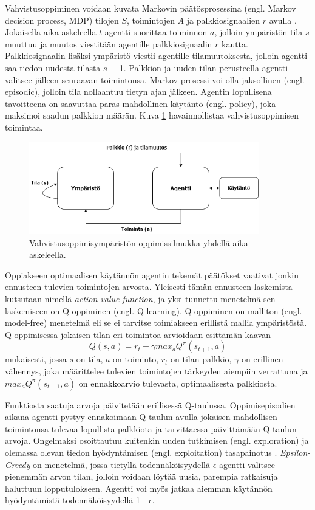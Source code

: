 \documentclass[utf8]{gradu3}
\begin{document}
Vahvistusoppiminen voidaan kuvata Markovin päätösprosessina (engl. Markov decision process, MDP) tilojen \(S\), toimintojen \(A\) ja palkkiosignaalien \(r\) avulla \parencite{arulkumaran2017brief}. Jokaisella aika-askeleella \(t\) agentti suorittaa toiminnon \(a\), jolloin ympäristön tila \(s\) muuttuu ja muutos viestitään agentille palkkiosignaalin \(r\) kautta. Palkkiosignaalin lisäksi ympäristö viestii agentille tilamuutoksesta, jolloin agentti saa tiedon uudesta tilasta \(s\) + 1. Palkkion ja uuden tilan perusteella agentti valitsee jälleen seuraavan toimintonsa. Markov-prosessi voi olla jaksollinen (engl. episodic), jolloin tila nollaantuu tietyn ajan jälkeen. Agentin lopullisena tavoitteena on saavuttaa paras mahdollinen käytäntö (engl. policy), joka maksimoi saadun palkkion määrän. Kuva \ref{reinflearning} havainnollistaa vahvistusoppimisen toimintaa.

\begin{figure}[h]
\includegraphics[width=10cm]{reinflearning.png}
\caption{Vahvistusoppimisympäristön oppimissilmukka yhdellä aika-askeleella.}
\label{reinflearning}
\end{figure}

Oppiakseen optimaalisen käytännön agentin tekemät päätökset vaativat jonkin ennusteen tulevien toimintojen arvosta. Yleisesti tämän ennusteen laskemista kutsutaan nimellä \textit{action-value function}, ja yksi tunnettu menetelmä sen laskemiseen on Q-oppiminen (engl. Q-learning). Q-oppiminen on malliton (engl. model-free) menetelmä eli se ei tarvitse toimiakseen erillistä mallia ympäristöstä. Q-oppimisessa jokaisen tilan eri toimintoa arvioidaan \textcite{arulkumaran2017brief} esittämän kaavan \[Q(s,a) = r_t + \gamma max_a Q^\pi (s_{t+1},a)\] mukaisesti, jossa \(s\) on tila, \(a\) on toiminto, \(r_t\) on tilan palkkio, $\gamma$ on erillinen vähennys, joka määrittelee tulevien toimintojen tärkeyden aiempiin verrattuna ja \(max_a Q^\pi (s_{t+1},a)\) on ennakkoarvio tulevasta, optimaalisesta palkkiosta.

Funktiosta saatuja arvoja päivitetään erillisessä Q-taulussa. Oppimisepisodien aikana agentti pystyy ennakoimaan Q-taulun avulla jokaisen mahdollisen toimintonsa tulevaa lopullista palkkiota ja tarvittaessa päivittämään Q-taulun arvoja. Ongelmaksi osoittautuu kuitenkin uuden tutkimisen (engl. exploration) ja olemassa olevan tiedon hyödyntämisen (engl. exploitation) tasapainotus \parencite{arulkumaran2017brief}. \textit{Epsilon-Greedy} on menetelmä, jossa tietyllä todennäköisyydellä $\epsilon$ agentti valitsee pienemmän arvon tilan, jolloin voidaan löytää uusia, parempia ratkaisuja haluttuun lopputulokseen. Agentti voi myös jatkaa aiemman käytännön hyödyntämistä todennäköisyydellä 1 - $\epsilon$.
\end{document}
